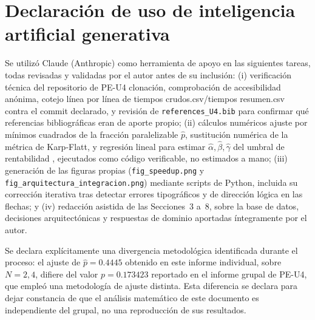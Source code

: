 \documentclass[11pt]{article}
\begin{document}
\section*{Declaración de uso de inteligencia artificial generativa}

Se utilizó Claude (Anthropic) como herramienta de apoyo en las
siguientes tareas, todas revisadas y validadas por el autor antes de su
inclusión: (i) verificación técnica del repositorio de PE-U4
clonación, comprobación de accesibilidad anónima, cotejo línea por línea
de tiempos crudos.csv/tiempos resumen.csv contra el
commit declarado, y revisión de \texttt{references\_U4.bib} para
confirmar qué referencias bibliográficas eran de aporte propio; (ii) cálculos numéricos ajuste por mínimos cuadrados de la fracción
paralelizable $\hat p$, sustitución numérica de la métrica de
Karp-Flatt, y regresión lineal para estimar $\hat\alpha,\hat\beta,
\hat\gamma$ del umbral de rentabilidad , ejecutados como código
verificable, no estimados a mano; (iii) generación de las figuras
propias (\texttt{fig\_speedup.png} y
\texttt{fig\_arquitectura\_integracion.png}) mediante scripts de
Python, incluida su corrección iterativa tras detectar errores
tipográficos y de dirección lógica en las flechas; y (iv) redacción
asistida de las Secciones~3 a~8, sobre la base de datos, decisiones
arquitectónicas y respuestas de dominio aportadas íntegramente por el
autor.

Se declara explícitamente una divergencia metodológica identificada
durante el proceso: el ajuste de $\hat p=0.4445$ obtenido en este
informe individual, sobre $N=2,4$, difiere del valor $p=0.173423$
reportado en el informe grupal de PE-U4, que empleó una metodología de
ajuste distinta. Esta diferencia se declara para dejar constancia de
que el análisis matemático de este documento es independiente del
grupal, no una reproducción de sus resultados.

\printbibliography
\end{document}
